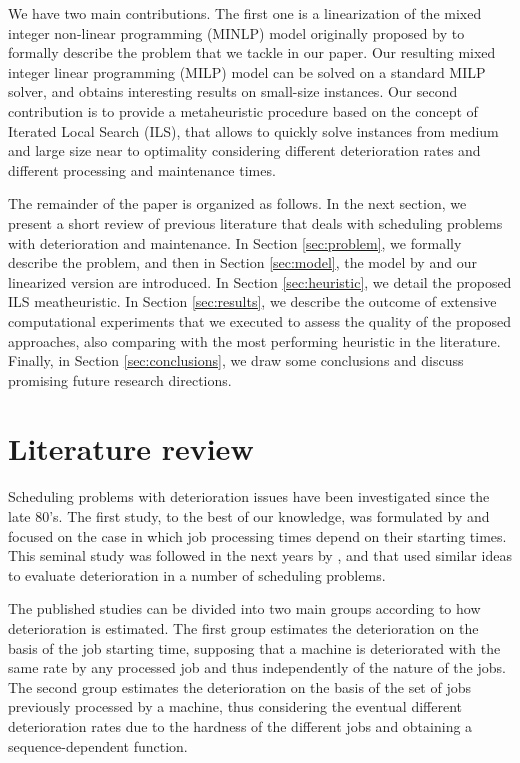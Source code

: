 \documentclass[a4paper,11pt]{article}
\begin{document}
We have two main contributions. The first one is a linearization of the mixed integer non-linear programming (MINLP) model originally proposed by \cite{ruiz2017makespan} to formally describe the problem that we tackle in our paper. Our resulting mixed integer linear programming (MILP) model can be solved on a standard MILP solver, and obtains interesting results on small-size instances. Our second contribution is to provide a metaheuristic procedure based on the concept of Iterated Local Search (ILS), that allows to quickly solve instances from medium and large size near to optimality considering different deterioration rates and different processing and maintenance times.
 
The remainder of the paper is organized as follows. In the next section, we present a short review of  previous literature that deals with scheduling problems with deterioration and maintenance. In Section \ref{sec:problem}, we formally describe the problem, and then in Section \ref{sec:model}, the model by \cite{ruiz2017makespan} and our linearized version are introduced.  In Section \ref{sec:heuristic}, we detail the proposed ILS meatheuristic. In Section \ref{sec:results}, we describe the outcome of extensive computational experiments that we executed to assess the quality of the proposed approaches, also comparing with the most performing heuristic in the literature. Finally, in Section \ref{sec:conclusions}, we draw some conclusions and discuss promising future research directions.  
 
\section{Literature review} \label{sec:literature}%

 Scheduling problems with deterioration issues have been investigated since the late 80's. The first study, to the best of our knowledge, was formulated by \cite{gupta1988single} and focused on the case in which job processing times depend on their starting times. This seminal study was followed in the next years by \cite{browne1990scheduling}, \cite{mosheiov1991v} and \cite{mosheiov1994scheduling} that used similar ideas to evaluate deterioration in a number of scheduling problems. 
 
 The published studies can be divided into two main groups according to how deterioration is estimated. The first group estimates the deterioration on the basis of the job starting time, supposing that a machine is deteriorated with the same rate by any processed job and thus independently of the nature of the jobs. The second group estimates the deterioration on the basis of the set of jobs previously processed by a machine, thus considering the eventual different deterioration rates due to the hardness of the different jobs and obtaining a sequence-dependent function. 
 
\end{document}
